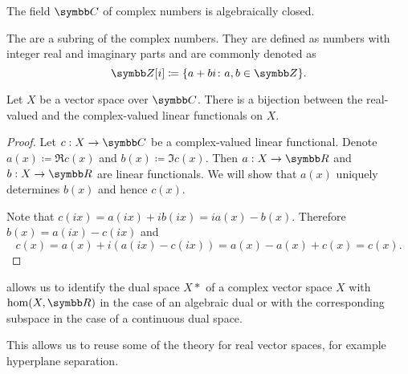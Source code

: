 \begin{theorem}\label{thm:fundamental_theorem_of_algebra}
  The field \( \BC \) of complex numbers is algebraically closed.
\end{theorem}

\begin{definition}\label{def:gaussian_integers}
  The  are a subring of the complex numbers. They are defined as numbers with integer real and imaginary parts and are commonly denoted as
  \begin{equation*}
    \BZ[i] \coloneqq \{ a + bi \colon a, b \in \BZ \}.
  \end{equation*}
\end{definition}

\begin{theorem}\label{thm:linear_functionals_over_c}
  Let \( X \) be a vector space over \( \BC \). There is a bijection between the real-valued and the complex-valued linear functionals on \( X \).
\end{theorem}
\begin{proof}
  Let \( c: X \to \BC \) be a complex-valued linear functional. Denote \( a(x) \coloneqq \Re c(x) \) and \( b(x) \coloneqq \Im c(x) \). Then \( a: X \to \BR \) and \( b: X \to \BR \) are linear functionals. We will show that \( a(x) \) uniquely determines \( b(x) \) and hence \( c(x) \).

  Note that \( c(ix) = a(ix) + i b(ix) = i a(x) - b(x) \). Therefore \( b(x) = a(ix) - c(ix) \) and
  \begin{equation*}
    c(x) = a(x) + i (a(ix) - c(ix)) = a(x) - a(x) + c(x) = c(x).
  \end{equation*}
\end{proof}

\begin{remark}\label{remark:linear_functionals_over_c}
   allows us to identify the dual space \( X* \) of a complex vector space \( X \) with \( \Hom(X, \BR) \) in the case of an algebraic dual or with the corresponding subspace in the case of a continuous dual space.

  This allows us to reuse some of the theory for real vector spaces, for example hyperplane separation.
\end{remark}
